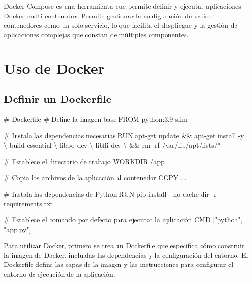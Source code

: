 \documentclass[
  a4paper,
  DIV=11,
  numbers=noendperiod,
  onepage,
  openany]{scrreprt}
\newenvironment{Shaded}{\begin{snugshade}}{\end{snugshade}}
\newcommand{\AttributeTok}[1]{\textcolor[rgb]{0.40,0.45,0.13}{#1}}
\newcommand{\CommentTok}[1]{\textcolor[rgb]{0.37,0.37,0.37}{#1}}
\newcommand{\DataTypeTok}[1]{\textcolor[rgb]{0.68,0.00,0.00}{#1}}
\newcommand{\ExtensionTok}[1]{\textcolor[rgb]{0.00,0.23,0.31}{#1}}
\newcommand{\FunctionTok}[1]{\textcolor[rgb]{0.28,0.35,0.67}{#1}}
\newcommand{\KeywordTok}[1]{\textcolor[rgb]{0.00,0.23,0.31}{#1}}
\newcommand{\NormalTok}[1]{\textcolor[rgb]{0.00,0.23,0.31}{#1}}
\newcommand{\PreprocessorTok}[1]{\textcolor[rgb]{0.68,0.00,0.00}{#1}}
\newcommand{\StringTok}[1]{\textcolor[rgb]{0.13,0.47,0.30}{#1}}
\begin{document}
Docker Compose es una herramienta que permite definir y ejecutar
aplicaciones Docker multi-contenedor. Permite gestionar la configuración
de varios contenedores como un solo servicio, lo que facilita el
despliegue y la gestión de aplicaciones complejas que constan de
múltiples componentes.

\chapter{Uso de Docker 🐋}\label{uso-de-docker}

\section{Definir un Dockerfile 📘}\label{definir-un-dockerfile}

\begin{Shaded}
\begin{Highlighting}[]
\CommentTok{\# Dockerfile}
\CommentTok{\# Define la imagen base}
\KeywordTok{FROM}\NormalTok{ python:3.9{-}slim}

\CommentTok{\# Instala las dependencias necesarias}
\KeywordTok{RUN} \ExtensionTok{apt{-}get}\NormalTok{ update }\KeywordTok{\&\&} \ExtensionTok{apt{-}get}\NormalTok{ install }\AttributeTok{{-}y} \DataTypeTok{\textbackslash{}}
\NormalTok{    build{-}essential }\DataTypeTok{\textbackslash{}}
\NormalTok{    libpq{-}dev }\DataTypeTok{\textbackslash{}}
\NormalTok{    libffi{-}dev }\DataTypeTok{\textbackslash{}}
    \KeywordTok{\&\&} \FunctionTok{rm} \AttributeTok{{-}rf}\NormalTok{ /var/lib/apt/lists/}\PreprocessorTok{*}

\CommentTok{\# Establece el directorio de trabajo}
\KeywordTok{WORKDIR}\NormalTok{ /app}

\CommentTok{\# Copia los archivos de la aplicación al contenedor}
\KeywordTok{COPY}\NormalTok{ . .}

\CommentTok{\# Instala las dependencias de Python}
\KeywordTok{RUN} \ExtensionTok{pip}\NormalTok{ install }\AttributeTok{{-}{-}no{-}cache{-}dir} \AttributeTok{{-}r}\NormalTok{ requirements.txt}

\CommentTok{\# Establece el comando por defecto para ejecutar la aplicación}
\KeywordTok{CMD}\NormalTok{ [}\StringTok{"python"}\NormalTok{, }\StringTok{"app.py"}\NormalTok{]}
\end{Highlighting}
\end{Shaded}

Para utilizar Docker, primero se crea un Dockerfile que especifica cómo
construir la imagen de Docker, incluidas las dependencias y la
configuración del entorno. El Dockerfile define las capas de la imagen y
las instrucciones para configurar el entorno de ejecución de la
aplicación.
\end{document}
